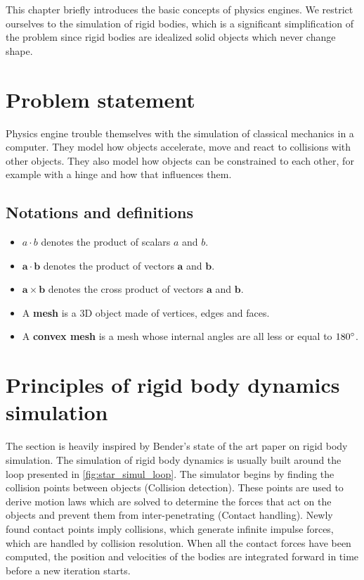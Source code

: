 This chapter briefly introduces the basic concepts of physics engines. We restrict ourselves to the simulation of rigid bodies, which is a significant simplification of the problem since rigid bodies are idealized solid objects which never change shape.

\section{Problem statement}
Physics engine trouble themselves with the simulation of classical mechanics in a computer. They model how objects accelerate, move and react to collisions with other objects. They also model how objects can be constrained to each other, for example with a hinge and how that influences them.

\subsection{Notations and definitions}
\begin{itemize}
\item $a\cdot b$ denotes the product of scalars $a$ and $b$.
\item $\mathbf{a}\cdot \mathbf{b}$ denotes the product of vectors $\mathbf{a}$ and $\mathbf{b}$.
\item $\mathbf{a}\times\mathbf{b}$ denotes the cross product of vectors $\mathbf{a}$ and $\mathbf{b}$.
\item A \textbf{mesh} is a 3D object made of vertices, edges and faces. 
\item A \textbf{convex mesh} is a mesh whose internal angles are all less or equal to $180\degree$.
\end{itemize}

\section{Principles of rigid body dynamics simulation}
The section is heavily inspired by Bender's \cite{bender2014interactive} state of the art paper on rigid body simulation. The simulation of rigid body dynamics is usually built around the loop presented in \cref{fig:star_simul_loop}. The simulator begins by finding the collision points between objects (Collision detection). These points are used to derive motion laws which are solved to determine the forces that act on the objects and prevent them from inter-penetrating (Contact handling). Newly found contact points imply collisions, which generate infinite impulse forces, which are handled by collision resolution. When all the contact forces have been computed, the position and velocities of the bodies are integrated forward in time before a new iteration starts.

